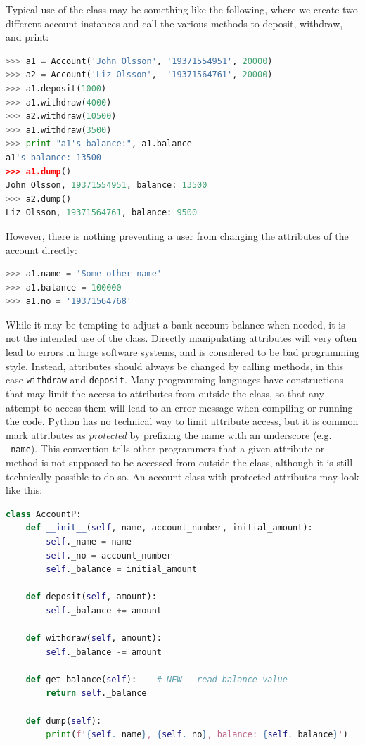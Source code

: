 \documentclass[graybox,envcountchap,sectrefs,final]{svmonodo}
\begin{document}
Typical use of the class may be something like the following, where we create two different account instances and
call the various methods to deposit, withdraw, and print:
\begin{lstlisting}[language=Python,style=blue1]
>>> a1 = Account('John Olsson', '19371554951', 20000)
>>> a2 = Account('Liz Olsson',  '19371564761', 20000)
>>> a1.deposit(1000)
>>> a1.withdraw(4000)
>>> a2.withdraw(10500)
>>> a1.withdraw(3500)
>>> print "a1's balance:", a1.balance
a1's balance: 13500
>>> a1.dump()
John Olsson, 19371554951, balance: 13500
>>> a2.dump()
Liz Olsson, 19371564761, balance: 9500
\end{lstlisting}
However, there is nothing preventing a user from changing the attributes of the account directly:
\begin{lstlisting}[language=Python,style=blue1]
>>> a1.name = 'Some other name'
>>> a1.balance = 100000
>>> a1.no = '19371564768'
\end{lstlisting}
While it may be tempting to adjust a bank account balance when needed, it is not the intended use of the class. Directly
manipulating attributes will very often lead to errors in large software systems, and is considered to be bad
programming style. Instead, attributes should always be changed by calling methods, in this case \texttt{withdraw} and \texttt{deposit}.
Many programming languages have constructions that may limit the access to attributes from outside the class, so
that any attempt to access them will lead to an error message when compiling or running the code. Python has no technical way to
limit attribute access, but it is common mark attributes as \emph{protected} by prefixing the name
with an underscore (e.g. \Verb!_name!). This convention tells other programmers that a given attribute or method is not
supposed to be accessed from outside the class, although it is still technically possible to do so. An
account class with protected attributes may look like this:
\begin{lstlisting}[language=Python,style=blue1]
class AccountP:
    def __init__(self, name, account_number, initial_amount):
        self._name = name
        self._no = account_number
        self._balance = initial_amount

    def deposit(self, amount):
        self._balance += amount

    def withdraw(self, amount):
        self._balance -= amount

    def get_balance(self):    # NEW - read balance value
        return self._balance

    def dump(self):
        print(f'{self._name}, {self._no}, balance: {self._balance}')
\end{lstlisting}
\end{document}
